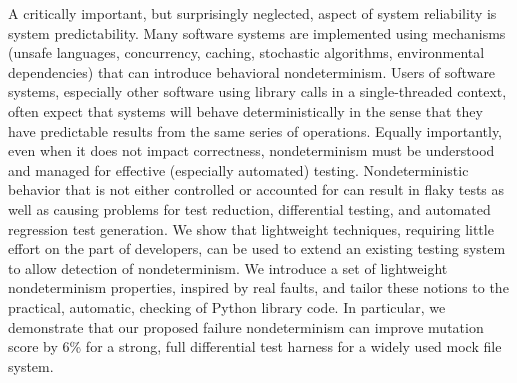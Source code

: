 A critically important, but surprisingly neglected, aspect of system reliability is system predictability.  Many software systems are implemented using mechanisms (unsafe languages, concurrency, caching, stochastic algorithms, environmental dependencies) that can introduce behavioral nondeterminism.  Users of software systems, especially other software using library calls in a single-threaded context, often expect that systems will behave deterministically in the sense that they have predictable results from the same series of operations.  Equally importantly, even when it does not impact correctness, nondeterminism must be understood and managed for effective (especially automated) testing.  Nondeterministic behavior that is not either controlled or accounted for can result in flaky tests as well as causing problems for test reduction, differential testing, and automated regression test generation.  We show that lightweight techniques, requiring little effort on the part of developers, can be used to extend an existing testing system to allow detection of nondeterminism.  We introduce a set of lightweight nondeterminism properties, inspired by real faults, and tailor these notions to the practical, automatic, checking of Python library code.  In particular, we demonstrate that our proposed failure nondeterminism can improve mutation score by 6\% for a strong, full differential test harness for a widely used mock file system. 